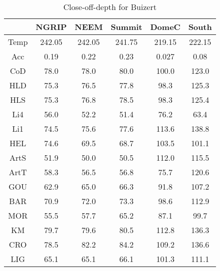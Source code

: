 \begin{table}[h]
\centering
\caption{Close-off-depth for Buizert}
\label{table:5}
\begin{tabular}{cccccc}
\toprule
{} & {NGRIP} & {NEEM} & {Summit} & {DomeC} & {South} \\
\midrule
Temp & 242.05 & 242.05 & 241.75 & 219.15 & 222.15 \\
Acc & 0.19 & 0.22 & 0.23 & 0.027 & 0.08 \\
CoD & 78.0 & 78.0 & 80.0 & 100.0 & 123.0 \\
HLD & 75.3 & 76.5 & 77.8 & 98.3 & 125.3 \\
HLS & 75.3 & 76.8 & 78.5 & 98.3 & 125.4 \\
Li4 & 56.0 & 52.2 & 51.4 & 76.2 & 63.4 \\
Li1 & 74.5 & 75.6 & 77.6 & 113.6 & 138.8 \\
HEL & 74.6 & 69.5 & 68.7 & 103.5 & 101.1 \\
ArtS & 51.9 & 50.0 & 50.5 & 112.0 & 115.5 \\
ArtT & 58.3 & 56.5 & 56.8 & 75.7 & 120.6 \\
GOU & 62.9 & 65.0 & 66.3 & 91.8 & 107.2 \\
BAR & 70.9 & 72.0 & 73.3 & 98.6 & 112.9 \\
MOR & 55.5 & 57.7 & 65.2 & 87.1 & 99.7 \\
KM & 79.7 & 79.6 & 80.5 & 112.8 & 136.3 \\
CRO & 78.5 & 82.2 & 84.2 & 109.2 & 136.6 \\
LIG & 65.1 & 65.1 & 66.1 & 101.3 & 111.1 \\
\bottomrule
\end{tabular}
\end{table}
